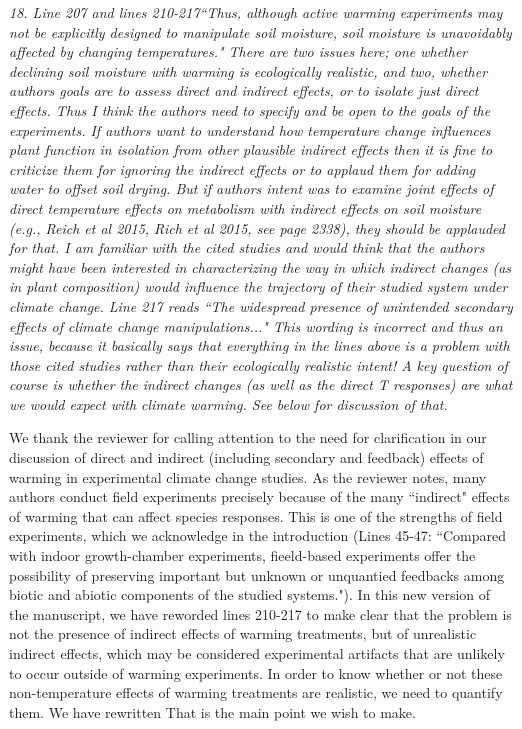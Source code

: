 \documentclass[11pt,a4paper]{letter}
\begin{document}
\begin{letter}{}
\emph{18. Line 207 and lines 210-217``Thus, although active warming experiments may not be explicitly designed to manipulate soil
moisture, soil moisture is unavoidably affected by changing temperatures." There are two issues here; one whether declining soil moisture with warming is ecologically
realistic, and two, whether authors goals are to assess direct and indirect effects, or to isolate
just direct effects. Thus I think the authors need to specify and be open to the goals of the
experiments. If authors want to understand how temperature change influences plant function
in isolation from other plausible indirect effects then it is fine to criticize them for ignoring the
indirect effects or to applaud them for adding water to offset soil drying. But if authors intent
was to examine joint effects of direct temperature effects on metabolism with indirect effects
on soil moisture (e.g., Reich et al 2015, Rich et al 2015, see page 2338), they should be
applauded for that. I am familiar with the cited studies and would think that the authors might
have been interested in characterizing the way in which indirect changes (as in plant
composition) would influence the trajectory of their studied system under climate change.
Line 217 reads ``The widespread presence of unintended secondary effects of climate change
manipulations..." This wording is incorrect and thus an issue, because it basically says that everything in the lines
above is a problem with those cited studies rather than their ecologically realistic intent! A key
question of course is whether the indirect changes (as well as the direct T responses) are what
we would expect with climate warming. See below for discussion of that.}

We thank the reviewer for calling attention to the need for clarification in our discussion of direct and indirect (including secondary and feedback) effects of warming in experimental climate change studies. As the reviewer notes, many authors conduct field experiments precisely because of the many ``indirect" effects of warming that can affect species responses. This is one of the strengths of field experiments, which we acknowledge in the introduction (Lines 45-47: ``Compared with indoor growth-chamber experiments, fieeld-based experiments offer the possibility of preserving important but unknown or unquantied feedbacks among biotic and abiotic components of the studied systems."). In this new version of the manuscript, we have reworded lines 210-217 to make clear that the problem is not the presence of indirect effects of warming treatments, but of unrealistic indirect effects, which may be considered experimental artifacts that are unlikely to occur outside of warming experiments. In order to know whether or not these non-temperature effects of warming treatments are realistic, we need to quantify them. We have rewritten That is the main point we wish to make.


\end{letter}
\end{document}
